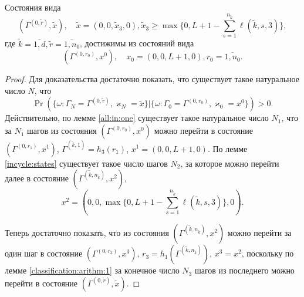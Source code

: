 \begin{lemma}
Состояния вида 
\begin{equation}
    (\Gamma^{(0,  \tilde{r})},  \tilde{x}),  \quad 
\tilde{x}=(0,  0,  \tilde{x}_3, 0),  \tilde{x}_3 \geqslant \max{\{0,  L+1-\sum_{s=1}^{n_{\tilde{k}}} \ell(\tilde{k},  s,  3)\}}, 
\label{classification:arithm:4:eq}
\end{equation}
где $\tilde{k}=\overline{1,  d},  \tilde{r} = \overline{1,  n_0}$,  достижимы из состояний вида 
\begin{equation*}
(\Gamma^{(0,  r_0)},  x^0),  \quad x_0=(0,  0,  L+1,  0),  r_0=\overline{1,  n_0}.
\end{equation*}
\label{classification:arithm:4}
\end{lemma}
\begin{proof}
Для доказательства достаточно показать,  что существует такое натуральное число $N$,  что 
\begin{equation*}
\Pr(\{\omega\colon \Gamma_{N}=\Gamma^{(0,  \tilde{r} )},  \varkappa_{N}=\tilde{x}\}|\{\omega\colon 
\Gamma_{0}=\Gamma^{(0,  r_0)},  \varkappa_{0}=x^0\})>0.
\end{equation*}
Действительно,  по лемме \ref{all:in:one} существует такое натуральное число $N_1$,  что за $N_1$ шагов из состояния $(\Gamma^{(0,  r_0)},  x^0)$ можно перейти в состояние  $(\Gamma^{(0,  r_1)},  x^1)$,  $\Gamma^{(\tilde{k},  1)}=h_3(r_1)$,  $x^1=(0,  0,  L+1,  0)$. По лемме \ref{incycle:states} существует такое число шагов $N_2$,  за которое можно перейти далее в состояние $(\Gamma^{(\tilde{k},  n_{\tilde{k}})},  x^2)$,  
\begin{equation*}
x^2=(0,  0,  \max{\{0,  L+1-\sum_{s=1}^{n_{\tilde{k}}} \ell(\tilde{k},  s,  3)\}},  0).
\end{equation*}

Теперь достаточно показать,  что из состояния $(\Gamma^{(\tilde{k},  n_{\tilde{k}})},  x^2)$ можно перейти за один шаг в состояние $(\Gamma^{(0,  r_3)},  x^3)$,  $r_3=h_1(\Gamma^{(\tilde{k},  n_{\tilde{k}})})$,  $x^3=x^2$,  поскольку по лемме \ref{classification:arithm:1} за конечное число $N_3$ шагов из последнего можно перейти в состояние $(\Gamma^{(0,  \tilde{r})},  \tilde{x})$.


\end{proof}
